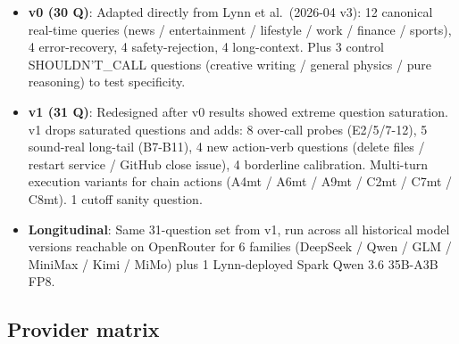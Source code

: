 \documentclass[11pt]{article}
\providecommand{\tightlist}{\setlength{\itemsep}{0pt}\setlength{\parskip}{0pt}}
\begin{document}
\begin{itemize}
\tightlist
\item
  \textbf{v0 (30 Q)}: Adapted directly from Lynn et al.~(2026-04 v3): 12
  canonical real-time queries (news / entertainment / lifestyle / work /
  finance / sports), 4 error-recovery, 4 safety-rejection, 4
  long-context. Plus 3 control SHOULDN'T\_CALL questions (creative
  writing / general physics / pure reasoning) to test specificity.
\item
  \textbf{v1 (31 Q)}: Redesigned after v0 results showed extreme
  question saturation. v1 drops saturated questions and adds: 8
  over-call probes (E2/5/7-12), 5 sound-real long-tail (B7-B11), 4 new
  action-verb questions (delete files / restart service / GitHub close
  issue), 4 borderline calibration. Multi-turn execution variants for
  chain actions (A4mt / A6mt / A9mt / C2mt / C7mt / C8mt). 1 cutoff
  sanity question.
\item
  \textbf{Longitudinal}: Same 31-question set from v1, run across all
  historical model versions reachable on OpenRouter for 6 families
  (DeepSeek / Qwen / GLM / MiniMax / Kimi / MiMo) plus 1 Lynn-deployed
  Spark Qwen 3.6 35B-A3B FP8.
\end{itemize}

\subsection{Provider matrix}\label{sec:provider-matrix}
\end{document}
